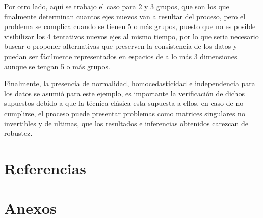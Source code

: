 \documentclass[11pt, letterpaper]{article}
\begin{document}
Por otro lado, aquí se trabajo el caso para 2 y 3 grupos, que son los que finalmente determinan cuantos ejes nuevos van a resultar del proceso, pero el problema se complica cuando se tienen 5 o más grupos, puesto que no es posible visibilizar los 4 tentativos nuevos ejes al mismo tiempo, por lo que seria necesario buscar o proponer alternativas que preserven la consistencia de los datos y puedan ser fácilmente representados en espacios de a lo más 3 dimensiones aunque se tengan 5 o más grupos.

Finalmente, la presencia de normalidad, homocedasticidad e independencia para los datos se asumió para este ejemplo, es importante la verificación de dichos supuestos debido a que la técnica clásica esta supuesta a ellos, en caso de no cumplirse, el proceso puede presentar problemas como matrices singulares no invertibles y de ultimas, que los resultados e inferencias obtenidos carezcan de 
robustez.
\newpage

	
\section{Referencias}  %

\newpage
	
\section{Anexos}	
\end{document}
